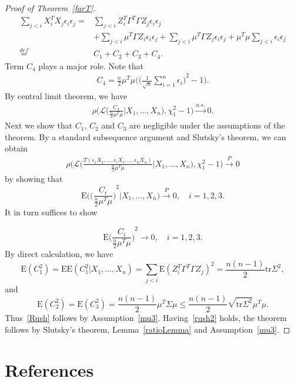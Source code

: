 \documentclass[review]{elsarticle}
\theoremstyle{plain}
\theoremstyle{definition}
\theoremstyle{remark}
\begin{document}
\begin{proof}[Proof of Theorem~\ref{farT}]
    \begin{equation*}
        \begin{aligned}
            \sum_{j<i} X_i^T X_j \epsilon_i\epsilon_j=&
            \sum_{j<i} Z_i^T \Gamma^T \Gamma Z_j \epsilon_i\epsilon_j\\
            &+
            \sum_{j<i} \mu^T \Gamma Z_i \epsilon_i\epsilon_j
            +\sum_{j<i} \mu^T \Gamma Z_j \epsilon_i\epsilon_j+
            \mu^T \mu \sum_{j<i} \epsilon_i\epsilon_j\\
            \overset{def}{=}&C_1+C_2+C_3+C_4.
        \end{aligned}
    \end{equation*}
Term $C_4$ plays a major role. Note that
    \begin{equation*}
        \begin{aligned}
            C_4=\frac{n}{2}\mu^T \mu\Big({\Big(\frac{1}{\sqrt{n}}\sum_{i=1}^n \epsilon_i\Big)}^2-1\Big).
        \end{aligned}
    \end{equation*}
By central limit theorem, we have
    \begin{equation*}
        \begin{aligned}
            \rho\Big(\mathcal{L}\Big(\frac{C_4}{\frac{n}{2}\mu^T \mu}\Big| X_1,\ldots,X_n\Big),\chi^2_1-1\Big)\xrightarrow{a.s.} 0.
        \end{aligned}
    \end{equation*}
Next we show that $C_1$, $C_2$ and $C_3$ are negligible under the assumptions of the theorem.
    By a standard subsequence argument and Slutsky's theorem, we can obtain
    \begin{equation}\label{rush2}
        \begin{aligned}
            \rho\Big(\mathcal{L}\Big(\frac{T(\epsilon_1 X_1,\ldots, \epsilon_i X_i,\ldots,\epsilon_n X_n)}{\frac{n}{2}\mu^T \mu}\Big| X_1,\ldots,X_n\Big),\chi^2_1-1\Big)\xrightarrow{P} 0
        \end{aligned}
    \end{equation}
    by showing that
    $$
    \mathrm{E}\Big({\Big(\frac{C_i}{\frac{n}{2}\mu^T\mu}\Big)}^2\Big|X_1,\ldots,X_n\Big)\xrightarrow{P} 0,\quad i=1,2,3.
    $$
    It in turn suffices to show

    \begin{equation}\label{Rush}
    \mathrm{E}{\Big(\frac{C_i}{\frac{n}{2}\mu^T\mu}\Big)}^2\to 0,
    \quad i=1,2,3.
    \end{equation}
    By direct calculation, we have
    $$\mathrm{E}(C_1^2)=\mathrm{E}\mathrm{E}(C_1^2|X_1,\ldots,X_n)=\sum_{j<i}\mathrm{E}{(Z_i^T \Gamma^T \Gamma Z_j)}^2=\frac{n(n-1)}{2}\mathrm{tr}\Sigma^2,$$
    and
    $$\mathrm{E}(C_2^2)=\mathrm{E}(C_3^2)=\frac{n(n-1)}{2}\mu^T \Sigma \mu\leq \frac{n(n-1)}{2}\sqrt{\mathrm{tr}\Sigma^2}\mu^T\mu.$$
    Thus~\eqref{Rush} follows by Assumption~\eqref{mu3}. Having~\eqref{rush2} holds, the theorem follows by Slutsky's theorem, Lemma~\ref{ratioLemma} and Assumption~\eqref{mu3}.
\end{proof}


\section*{References}


\end{document}
